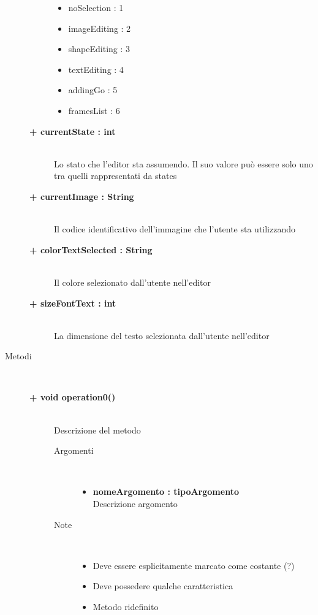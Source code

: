 \begin{description}
\begin{description}
		\begin{itemize}
			\item noSelection : 1
			\item imageEditing : 2
			\item shapeEditing : 3
			\item textEditing : 4
			\item addingGo : 5
			\item framesList : 6
		\end{itemize}
		\item[\textbf{+ currentState : int			}] \hfill \\
			Lo stato che l'editor sta assumendo. Il suo valore può essere solo uno tra quelli rappresentati da states
		\item[\textbf{+ currentImage : String			}] \hfill \\
			Il codice identificativo dell'immagine che l'utente sta utilizzando
		\item[\textbf{+ colorTextSelected : String			}] \hfill \\
			Il colore selezionato dall'utente nell'editor
		\item[\textbf{+ sizeFontText : int			}] \hfill \\
			La dimensione del testo selezionata dall'utente nell'editor
	\end{description}
	
	
\item[Metodi] \hfill \\

	\begin{description}
		\item[\textbf{\color{blue}+ void operation0()			}] \hfill \\
			Descrizione del metodo
			
		\begin{description}
			\item[Argomenti] \hfill \\
				\begin{itemize}
				
					\item \textbf{nomeArgomento : tipoArgomento			} \hfill \\
					Descrizione argomento
					
				\end{itemize}
			\item[Note] \hfill \\
			\begin{itemize}
					\item Deve essere esplicitamente marcato come costante (?)
					\item Deve possedere qualche caratteristica
					\item Metodo ridefinito
			\end{itemize}
		\end{description}
	\end{description}

\end{description}